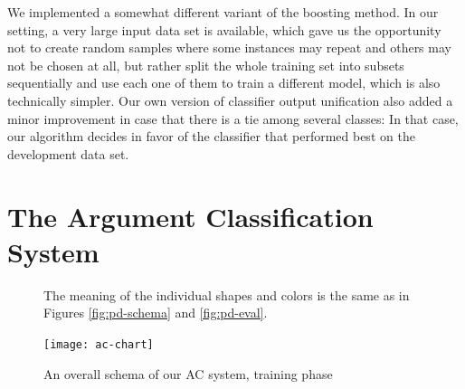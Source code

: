 \documentclass[12pt,notitlepage,a4paper]{report}
\begin{document}
We implemented a somewhat different variant of the boosting method. In our setting, a very large input data set is available, which gave us the opportunity not to create random samples where some instances may repeat and others may not be chosen at all, but rather split the whole training set into subsets sequentially and use each one of them to train a different model, which is also technically simpler. Our own version of classifier output unification also added a minor improvement in case that there is a tie among several classes: In that case, our algorithm decides in favor of the classifier that performed best on the development data set.

\section{The Argument Classification System}\label{ac-overview}

\begin{figure}[p]\footnotesize
\caption{An overall schema of our AC system, training phase}\label{fig:ac-schema}
\noindent The meaning of the individual shapes and colors is the same as in Figures \ref{fig:pd-schema} and \ref{fig:pd-eval}.
\begin{center}
\texttt{[image: ac-chart]}
\end{center}
\end{figure}
\end{document}
